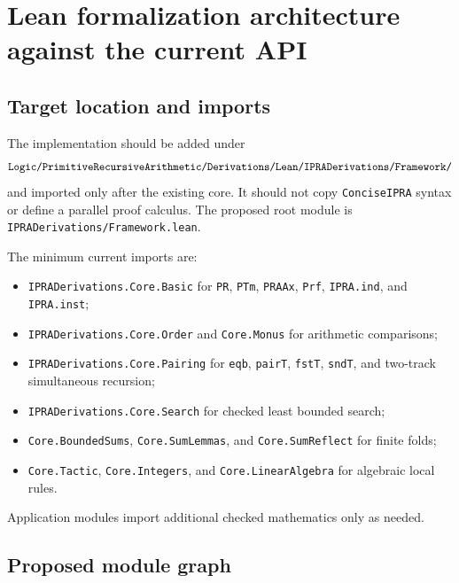\section{Lean formalization architecture against the current API}\label{sec:lean}

\subsection{Target location and imports}

The implementation should be added under
\[
\texttt{Logic/PrimitiveRecursiveArithmetic/Derivations/Lean/IPRADerivations/Framework/}
\]
and imported only after the existing core.  It should not copy \texttt{ConciseIPRA} syntax or define a parallel proof calculus.  The proposed root module is \texttt{IPRADerivations/Framework.lean}.

The minimum current imports are:
\begin{itemize}
  \item \texttt{IPRADerivations.Core.Basic} for \texttt{PR}, \texttt{PTm}, \texttt{PRAAx}, \texttt{Prf}, \texttt{IPRA.ind}, and \texttt{IPRA.inst};
  \item \texttt{IPRADerivations.Core.Order} and \texttt{Core.Monus} for arithmetic comparisons;
  \item \texttt{IPRADerivations.Core.Pairing} for \texttt{eqb}, \texttt{pairT}, \texttt{fstT}, \texttt{sndT}, and two-track simultaneous recursion;
  \item \texttt{IPRADerivations.Core.Search} for checked least bounded search;
  \item \texttt{Core.BoundedSums}, \texttt{Core.SumLemmas}, and \texttt{Core.SumReflect} for finite folds;
  \item \texttt{Core.Tactic}, \texttt{Core.Integers}, and \texttt{Core.LinearAlgebra} for algebraic local rules.
\end{itemize}
Application modules import additional checked mathematics only as needed.

\subsection{Proposed module graph}

